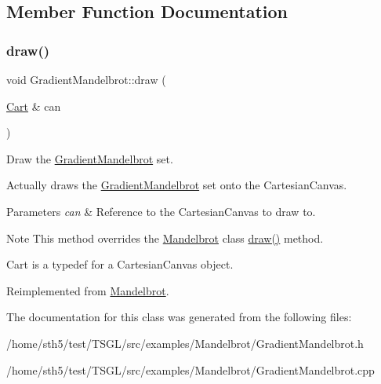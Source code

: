 \subsection{Member Function Documentation}
\mbox{\label{class_gradient_mandelbrot_a1d4aa3e44d7d1c2241545b60c79985df}} 
\subsubsection{\texorpdfstring{draw()}{draw()}}
{\footnotesize\ttfamily void Gradient\+Mandelbrot\+::draw (\begin{DoxyParamCaption}\item[{\hyperlink{classtsgl_1_1_cartesian_canvas}{Cart} \&}]{can }\end{DoxyParamCaption})\hspace{0.3cm}{\ttfamily [virtual]}}



Draw the \hyperlink{class_gradient_mandelbrot}{Gradient\+Mandelbrot} set. 

Actually draws the \hyperlink{class_gradient_mandelbrot}{Gradient\+Mandelbrot} set onto the Cartesian\+Canvas. 
\begin{DoxyParams}{Parameters}
{\em can} & Reference to the Cartesian\+Canvas to draw to. \\
\hline
\end{DoxyParams}
\begin{DoxyNote}{Note}
This method overrides the \hyperlink{class_mandelbrot}{Mandelbrot} class\textquotesingle{} \hyperlink{class_gradient_mandelbrot_a1d4aa3e44d7d1c2241545b60c79985df}{draw()} method. 

Cart is a typedef for a Cartesian\+Canvas object. 
\end{DoxyNote}


Reimplemented from \hyperlink{class_mandelbrot_ab7918e4de8f00f73290f110ca7a6cffd}{Mandelbrot}.



The documentation for this class was generated from the following files\+:\begin{DoxyCompactItemize}
\item 
/home/sth5/test/\+T\+S\+G\+L/src/examples/\+Mandelbrot/Gradient\+Mandelbrot.\+h\item 
/home/sth5/test/\+T\+S\+G\+L/src/examples/\+Mandelbrot/Gradient\+Mandelbrot.\+cpp\end{DoxyCompactItemize}
